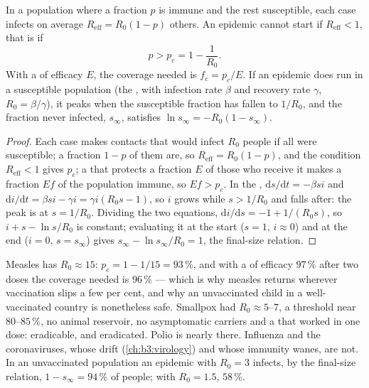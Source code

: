 \begin{theorem}\label{thm:b3:adaptive-immunity:herd}
In a population where a fraction $p$ is immune and the rest
susceptible, each case infects on average $R_{\text{eff}} = R_{0}(1 -
p)$ others. An epidemic cannot start if $R_{\text{eff}} < 1$, that is
if
\[
p > p_{c} = 1 - \frac{1}{R_{0}} .
\]
With a  of efficacy $E$, the coverage needed is $f_{c} = p_{c}/E$.
If an epidemic does run in a susceptible population (the ,
with infection rate $\beta$ and recovery rate $\gamma$, $R_{0} =
\beta/\gamma$), it peaks when the susceptible fraction has fallen to
$1/R_{0}$, and the fraction never infected, $s_{\infty}$, satisfies
$\ln s_{\infty} = -R_{0}(1 - s_{\infty})$.
\end{theorem}
\begin{proof}
Each case makes contacts that would infect $R_{0}$ people if all were
susceptible; a fraction $1 - p$ of them are, so $R_{\text{eff}} =
R_{0}(1-p)$, and the condition $R_{\text{eff}} < 1$ gives $p_{c}$; a
 that protects a fraction $E$ of those who receive it makes a
fraction $Ef$ of the population immune, so $Ef > p_{c}$. In the , $\mathrm{d}s/\mathrm{d}t = -\beta si$ and $\mathrm{d}i/\mathrm{d}t =
\beta si - \gamma i = \gamma i(R_{0}s - 1)$, so $i$ grows while $s >
1/R_{0}$ and falls after: the peak is at $s = 1/R_{0}$. Dividing the
two equations, $\mathrm{d}i/\mathrm{d}s = -1 + 1/(R_{0}s)$, so $i + s -
\ln s/R_{0}$ is constant; evaluating it at the start ($s = 1$, $i
\approx 0$) and at the end ($i = 0$, $s = s_{\infty}$) gives
$s_{\infty} - \ln s_{\infty}/R_{0} = 1$, the final-size relation.
\end{proof}

\begin{example}\label{ex:b3:adaptive-immunity:measles}
Measles has $R_{0} \approx 15$: $p_{c} = 1 - 1/15 = 93\,\%$, and with a
 of efficacy $97\,\%$ after two doses the coverage needed is
$96\,\%$ --- which is why measles returns wherever vaccination slips a
few per cent, and why an unvaccinated child in a well-vaccinated
country is nonetheless safe. Smallpox had $R_{0} \approx 5$--$7$, a
threshold near $80$--$85\,\%$, no animal reservoir, no asymptomatic
carriers and a  that worked in one dose: eradicable, and
eradicated. Polio is nearly there. Influenza and the coronaviruses,
whose  drift (\cref{ch:b3:virology}) and whose immunity wanes,
are not. In an unvaccinated population an epidemic with $R_{0} = 3$
infects, by the final-size relation, $1 - s_{\infty} = 94\,\%$ of
people; with $R_{0} = 1.5$, $58\,\%$.
\end{example}

